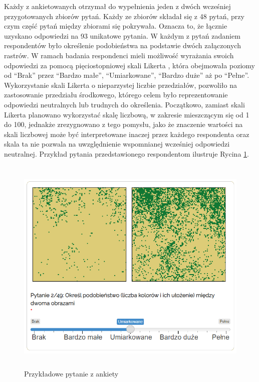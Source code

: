 \documentclass{amuthesis}
\begin{document}
Każdy z ankietowanych otrzymał do wypełnienia jeden z dwóch wcześniej
przygotowanych zbiorów pytań. Każdy ze zbiorów składał się z 48 pytań,
przy czym część pytań między zbiorami się pokrywała. Oznacza to, że
łącznie uzyskano odpowiedzi na 93 unikatowe pytania. W każdym z pytań
zadaniem respondentów było określenie podobieństwa na podstawie dwóch
załączonych rastrów. W ramach badania respondenci mieli możliwość
wyrażania swoich odpowiedzi za pomocą pięciostopniowej skali Likerta
\autocite{likert_scale}, która obejmowała poziomy od ``Brak'' przez
``Bardzo małe'', ``Umiarkowane'', ``Bardzo duże'' aż po ``Pełne''.
Wykorzystanie skali Likerta o nieparzystej liczbie przedziałów,
pozwoliło na zastosowanie przedziału środkowego, którego celem było
reprezentowanie odpowiedzi neutralnych lub trudnych do określenia.
Początkowo, zamiast skali Likerta planowano wykorzystać skalę liczbową,
w zakresie mieszczącym się od 1 do 100, jednakże zrezygnowano z tego
pomysłu, jako że znaczenie wartości na skali liczbowej może być
interpretowane inaczej przez każdego respondenta oraz skala ta nie
pozwala na uwzględnienie wspomnianej wcześniej odpowiedzi neutralnej.
Przykład pytania przedstawionego respondentom ilustruje Rycina
\ref{fig-przyklad_pytania}.

\begin{figure}[t]

{\centering \includegraphics[width=5.10417in,height=4.16667in]{figures/przyklad_pytania.png}

}

\caption{\label{fig-przyklad_pytania}Przykładowe pytanie z ankiety}

\end{figure}
\end{document}
